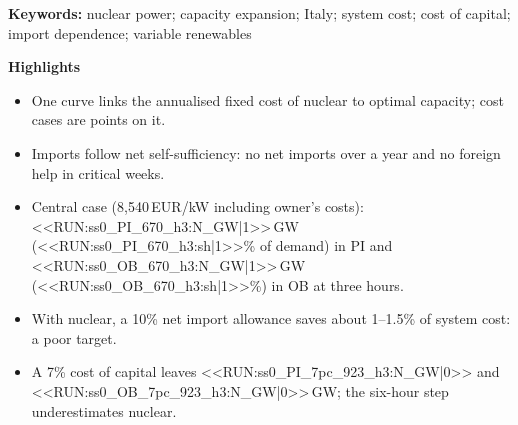\documentclass[11pt,a4paper]{article}
\begin{document}
\begin{abstract}
\end{abstract}

\noindent\textbf{Keywords:} nuclear power; capacity expansion; Italy; system cost; cost of capital; import dependence; variable renewables

\medskip
\noindent\textbf{Highlights}
\begin{itemize}\setlength\itemsep{0pt}
\item One curve links the annualised fixed cost of nuclear to optimal capacity; cost cases are points on it.
\item Imports follow net self-sufficiency: no net imports over a year and no foreign help in critical weeks.
\item Central case (8{,}540\,EUR/kW including owner's costs): <<RUN:ss0_PI_670_h3:N_GW|1>>\,GW (<<RUN:ss0_PI_670_h3:sh|1>>\% of demand) in PI and <<RUN:ss0_OB_670_h3:N_GW|1>>\,GW (<<RUN:ss0_OB_670_h3:sh|1>>\%) in OB at three hours.
\item With nuclear, a 10\% net import allowance saves about 1--1.5\% of system cost: a poor target.
\item A 7\% cost of capital leaves <<RUN:ss0_PI_7pc_923_h3:N_GW|0>> and <<RUN:ss0_OB_7pc_923_h3:N_GW|0>>\,GW; the six-hour step underestimates nuclear.
\end{itemize}





\end{document}
